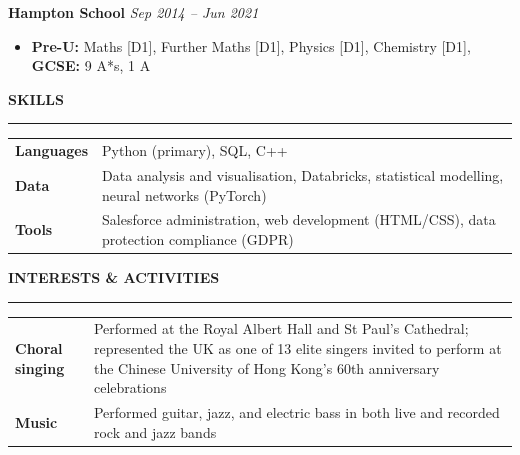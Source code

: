 \documentclass[11pt, a4paper]{article}
\newcommand{\cvsection}[1]{%
  \vspace{7pt}%
  {\small\bfseries\color{navy}\MakeUppercase{#1}}\par%
  \nopagebreak\vspace{-8pt}%
  {\color{navy}\rule{\linewidth}{0.4pt}}\par%
  \vspace{3pt}%
}
\newcommand{\jobheader}[3]{%
  \vspace{4pt}%
  \noindent\textbf{#1}%
  \ifx\relax#2\relax\else{\color{mygray}\ \ |\ \ #2}\fi%
  \hfill{\color{mygray}\small\textit{#3}}\par%
  \vspace{1pt}%
}
\begin{document}
\jobheader{Hampton School}{}{Sep 2014 -- Jun 2021}
\begin{itemize}
  \item \textbf{Pre-U:} Maths [D1], Further Maths [D1], Physics [D1], Chemistry [D1], \textbf{GCSE:} 9 A*s, 1 A \\
\end{itemize}

\cvsection{Skills}

\vspace{1pt}
\begin{tabularx}{\textwidth}{@{}lX@{}}
  \textbf{Languages}  & Python (primary), SQL, C++ \\[2pt]
  \textbf{Data}       & Data analysis and visualisation, Databricks, statistical modelling,
                        neural networks (PyTorch) \\[2pt]
  \textbf{Tools}      & Salesforce administration, web development (HTML/CSS),
                        data protection compliance (GDPR) \\
\end{tabularx}

\cvsection{Interests \& Activities}

\vspace{1pt}
\begin{tabularx}{\textwidth}{@{}lX@{}}
  \textbf{Choral singing} & Performed at the Royal Albert Hall and St Paul's Cathedral;
                            represented the UK as one of 13 elite singers invited to perform
                            at the Chinese University of Hong Kong's 60th anniversary
                            celebrations \\
  \textbf{Music}          & Performed guitar, jazz, and electric bass in both live and recorded rock and jazz bands \\
\end{tabularx}
\end{document}
